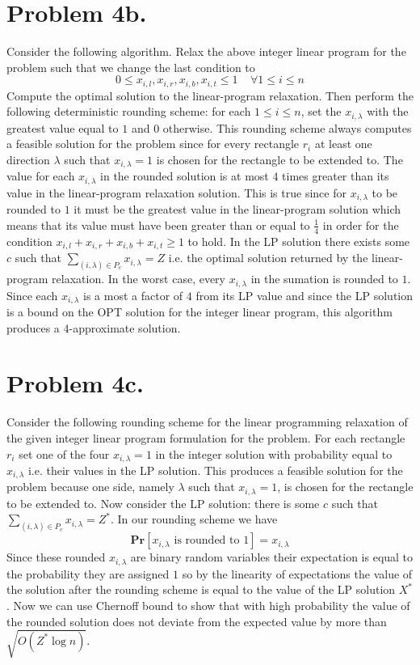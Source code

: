 \documentclass[12pt]{article}
\begin{document}
\section*{Problem 4b.}
Consider the following algorithm. Relax the above integer linear program for the
problem such that we change the last condition to
$$0\le x_{i,l}, x_{i,r}, x_{i,b}, x_{i,t} \le 1\ \ \ \ \ \forall 1 \le i \le n$$
Compute the optimal solution to the linear-program relaxation. Then perform the
following deterministic rounding scheme: for each $1 \le i \le n$, set the
$x_{i,\lambda}$ with the greatest value equal to $1$ and $0$ otherwise. This
rounding scheme always computes a feasible solution for the problem since for
every rectangle $r_i$ at least one direction $\lambda$ such that
$x_{i,\lambda} = 1$ is chosen for the rectangle to be extended to. The value
for each $x_{i,\lambda}$ in the rounded solution is at most $4$ times greater
than its value in the linear-program relaxation solution. This is true since
for $x_{i,\lambda}$ to be rounded to $1$ it must be the greatest value in the
linear-program solution which means that its value must have been greater than
or equal to $\frac{1}{4}$ in order for the condition
$x_{i,l} + x_{i,r} + x_{i,b} + x_{i,t} \ge 1$ to hold. In the LP solution there
exists some $c$ such that $\sum_{(i,\lambda) \in P_c} x_{i,\lambda} = Z$ i.e.
the optimal solution returned by the linear-program relaxation. In the worst
case, every $x_{i,\lambda}$ in the sumation is rounded to $1$. Since each
$x_{i,\lambda}$ is a most a factor of $4$ from its LP value and since the
LP solution is a bound on the OPT solution for the integer linear program, this
algorithm produces a $4$-approximate solution.

\section*{Problem 4c.}
Consider the following rounding scheme for the linear programming relaxation of
the given integer linear program formulation for the problem. For each
rectangle $r_i$ set one of the four $x_{i,\lambda} = 1$ in the integer solution
with probability equal to $x_{i,\lambda}$ i.e. their values in the LP solution.
This produces a feasible solution for the problem because one side, namely
$\lambda$ such that $x_{i,\lambda} = 1$, is chosen for the rectangle to be
extended to. Now consider the LP solution: there is some $c$ such that
$\sum_{(i,\lambda) \in P_c} x_{i,\lambda} = Z^*$. In our rounding scheme we
have
$$\textbf{Pr}[x_{i,\lambda} \text{ is rounded to } 1] = x_{i,\lambda}$$
Since these rounded $x_{i,\lambda}$ are binary random variables their
expectation is equal to the probability they are assigned $1$ so by the linearity
of expectations the value of the solution after the rounding scheme is equal to
the value of the LP solution $X^*$. Now we can use Chernoff bound to show that
with high probability the value of the rounded solution does not deviate from
the expected value by more than $\sqrt{O(Z^*\log n)}$.
\end{document}
